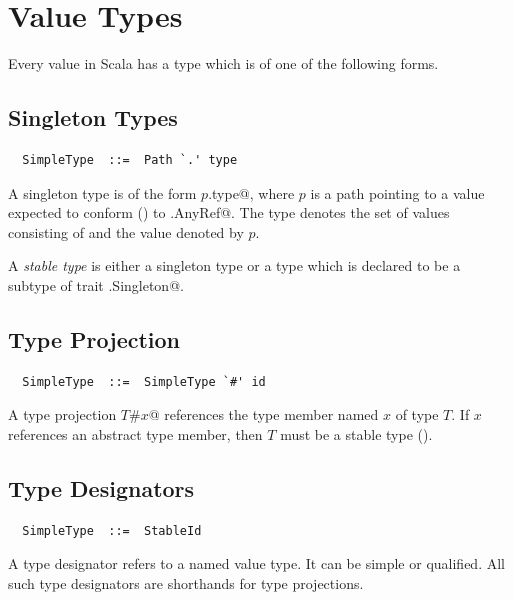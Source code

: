 \section{Value Types}\label{sec:value-types}

Every value in Scala has a type which is of one of the following
forms.

\subsection{Singleton Types}
\label{sec:singleton-types}
\label{sec:type-stability}

\syntax\begin{lstlisting}
  SimpleType  ::=  Path `.' type
\end{lstlisting}

A singleton type is of the form \lstinline@$p$.type@, where $p$ is a
path pointing to a value expected to conform ()
to \lstinline@scala.AnyRef@.  The type denotes the set of values
consisting of  and the value denoted by $p$. 

A {\em stable type} is either a singleton type or a type which is
declared to be a subtype of trait \lstinline@scala.Singleton@.

\subsection{Type Projection}
\label{sec:type-project}

\syntax\begin{lstlisting} 
  SimpleType  ::=  SimpleType `#' id
\end{lstlisting}

A type projection \lstinline@$T$#$x$@ references the type member named
$x$ of type $T$. If $x$ references an abstract type member, then $T$
must be a stable type (). 

\subsection{Type Designators}
\label{sec:type-desig}

\syntax\begin{lstlisting}
  SimpleType  ::=  StableId
\end{lstlisting}

A type designator refers to a named value type. It can be simple or
qualified. All such type designators are shorthands for type projections.

